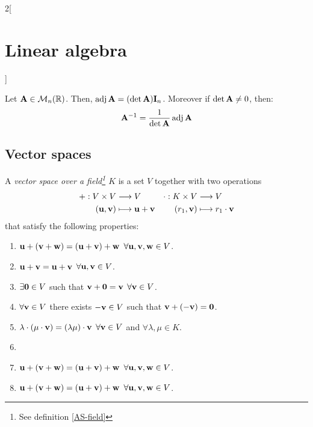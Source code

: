 \documentclass[../../../main.tex]{subfiles}
\begin{document}
\begin{multicols}{2}[\section{Linear algebra}]
\begin{definition}
\end{definition}
\begin{theorem}
    Let $\vb{A}\in\mathcal{M}_n(\mathbb{R})$. Then, $\operatorname{adj}\vb{A}=(\det \vb{A})\vb{I}_n$. Moreover if $\det \vb{A}\ne 0$, then: $$\vb{A}^{-1}=\frac{1}{\det \vb{A}}\operatorname{adj}\vb{A}$$
\end{theorem}
\subsection{Vector spaces}
\begin{definition}
    A \textit{vector space over a field\footnote{See definition \ref{AS-field}} $K$} is a set $V$ together with two operations
    \begin{align*}
        +:V\times V&\longrightarrow V&\cdot:K\times V&\longrightarrow V\\
        (\vb{u},\vb{v})&\longmapsto \vb{u}+ \vb{v}&(r_1,\vb{v})&\longmapsto r_1\cdot \vb{v}
    \end{align*}
    that satisfy the following properties:
    \begin{enumerate}
        \item $\vb{u}+(\vb{v}+\vb{w})=(\vb{u}+\vb{v})+\vb{w}$ $\forall\vb{u},\vb{v},\vb{w}\in V$.
        \item $\vb{u}+\vb{v}=\vb{u}+\vb{v}$ $\forall\vb{u},\vb{v}\in V$.
        \item $\exists\vb{0}\in V$ such that $\vb{v}+\vb{0}=\vb{v}$ $\forall\vb{v}\in V$.
        \item $\forall\vb{v}\in V$ there exists $-\vb{v}\in V$ such that $\vb{v}+(-\vb{v})=\vb{0}$.                  
        \item $\lambda\cdot(\mu\cdot\vb{v})=(\lambda\mu)\cdot\vb{v}$ $\forall\vb{v}\in V$ and $\forall\lambda,\mu\in K$.
        \item  
        \item $\vb{u}+(\vb{v}+\vb{w})=(\vb{u}+\vb{v})+\vb{w}$ $\forall\vb{u},\vb{v},\vb{w}\in V$.
        \item $\vb{u}+(\vb{v}+\vb{w})=(\vb{u}+\vb{v})+\vb{w}$ $\forall\vb{u},\vb{v},\vb{w}\in V$.

\end{enumerate}
\end{definition}
\end{multicols}
\end{document}
